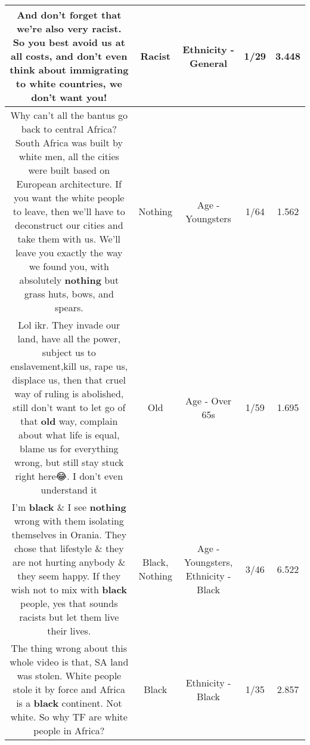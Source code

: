 \documentclass[11pt]{article}
\newlength\mylength
\begin{document}
\begin{center}
\begin{longtable}{|C{.65\mylength}|C{.30\mylength}|C{.12\mylength}|C{.12\mylength}|C{.12\mylength}|}
  \small And don't forget that we're also very \textbf{racist}. So you best avoid us at all costs, and don't even think about immigrating to white countries, we don't want you!\normalsize   & Racist & Ethnicity - General & 1/29 & 3.448 \\  \hline
  \small Why can't all the bantus go back to central Africa? South Africa was built by white men, all the cities were built based on European architecture. If you want the white people to leave, then we'll have to deconstruct our cities and take them with us. We'll leave you exactly the way we found you, with absolutely \textbf{nothing} but grass huts, bows, and spears.\normalsize   & Nothing & Age - Youngsters & 1/64 & 1.562 \\  \hline
  \small Lol ikr. They invade our land, have all the power, subject us to enslavement,kill us, rape us, displace us, then that cruel way of ruling is abolished, still don't want to let go of that \textbf{old} way, complain about what life is equal, blame us for everything wrong, but still stay stuck right here😂.  I don't even understand it\normalsize   & Old & Age - Over 65s & 1/59 & 1.695 \\  \hline
  \small I'm \textbf{black} \& I see \textbf{nothing} wrong with them isolating themselves in Orania. They chose that lifestyle \& they are not hurting anybody \& they seem happy. If they wish not to mix with \textbf{black} people, yes that sounds racists but let them live their lives.\normalsize   & Black, Nothing & Age - Youngsters, Ethnicity - Black & 3/46 & 6.522 \\  \hline
  \small The thing wrong about this whole video is that, SA land was stolen. White people stole it by force and Africa is a \textbf{black} continent. Not white. So why TF are white people in Africa?\normalsize   & Black & Ethnicity - Black & 1/35 & 2.857 \\  \hline

\end{longtable}
\end{center}
\end{document}
